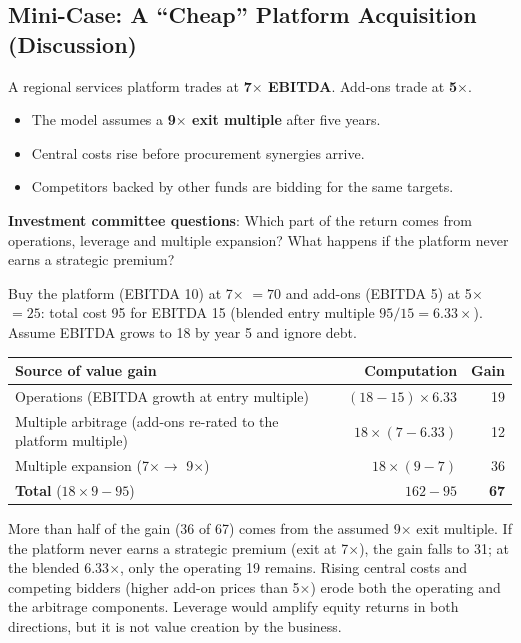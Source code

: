 \subsection{Mini-Case: A ``Cheap'' Platform Acquisition (Discussion)}
\begin{exbox}
A regional services platform trades at \textbf{7$\times$ EBITDA}. Add-ons trade at \textbf{5$\times$}.
\begin{itemize}
  \item The model assumes a \textbf{9$\times$ exit multiple} after five years.
  \item Central costs rise before procurement synergies arrive.
  \item Competitors backed by other funds are bidding for the same targets.
\end{itemize}
\textbf{Investment committee questions}: Which part of the return comes from operations, leverage and multiple expansion? What happens if the platform never earns a strategic premium?
\end{exbox}
\begin{exbox}
Buy the platform (EBITDA 10) at 7$\times$ $=70$ and add-ons (EBITDA 5) at 5$\times$ $=25$: total cost 95 for EBITDA 15 (blended entry multiple $95/15=6.33\times$). Assume EBITDA grows to 18 by year 5 and ignore debt.
\begin{center}
\small
\begin{tabular}{@{}lrr@{}}
\toprule
\textbf{Source of value gain} & \textbf{Computation} & \textbf{Gain}\\
\midrule
Operations (EBITDA growth at entry multiple) & $(18-15)\times6.33$ & 19\\
Multiple arbitrage (add-ons re-rated to the platform multiple) & $18\times(7-6.33)$ & 12\\
Multiple expansion (7$\times\to$ 9$\times$) & $18\times(9-7)$ & 36\\
\midrule
\textbf{Total} ($18\times9-95$) & $162-95$ & \textbf{67}\\
\bottomrule
\end{tabular}
\end{center}
More than half of the gain (36 of 67) comes from the assumed 9$\times$ exit multiple. If the platform never earns a strategic premium (exit at 7$\times$), the gain falls to 31; at the blended 6.33$\times$, only the operating 19 remains. Rising central costs and competing bidders (higher add-on prices than 5$\times$) erode both the operating and the arbitrage components. Leverage would amplify equity returns in both directions, but it is not value creation by the business.
\end{exbox}

